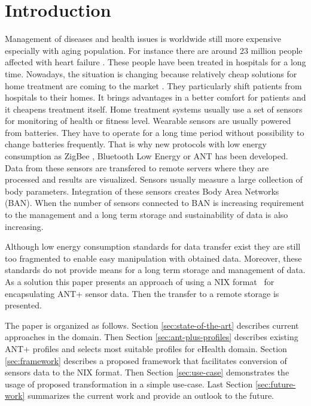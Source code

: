 \documentclass[conference]{IEEEtran}
\begin{document}
\section{Introduction}\label{sec:intro}
Management of diseases and health issues is worldwide still more expensive especially with aging population. For instance there are around 23 million people affected with heart failure \cite{bui2011epidemiology}. These people have been treated in hospitals for a long time. Nowadays, the situation is changing because relatively cheap solutions for home treatment are coming to the market \cite{4761985, 5333913}. They particularly shift patients from hospitals to their homes. It brings advantages in a better comfort for patients and it cheapens treatment itself. Home treatment systems usually use a set of sensors for monitoring of health or fitness level. Wearable sensors are usually powered from batteries. They have to operate for a long time period without possibility to change batteries frequently. That is why new protocols with low energy consumption as ZigBee \cite{Farahani:2008:ZWN:1457417}, Bluetooth Low Energy \cite{heydon2012bluetooth} or ANT \cite{zaloker2014ant} has been developed.  Data from these sensors are transfered to remote servers where they are processed and results are visualized. Sensors usually measure a large collection of body parameters. Integration of these sensors creates Body Area Networks (BAN). When the number of sensors connected to BAN is increasing requirement to the management and a long term storage and sustainability of data is also increasing.

Although low energy consumption standards for data transfer exist they are still too fragmented to enable easy manipulation with obtained data. Moreover, these standards do not provide means for a long term storage and management of data. As a solution this paper presents an approach of using a NIX format~\cite{Stoewer:2014} for encapsulating ANT+ sensor data. Then the transfer to a remote storage is presented. 

The paper is organized as follows. Section \ref{sec:state-of-the-art} describes current approaches in the domain. Then Section \ref{sec:ant-plus-profiles} describes existing ANT+ profiles and selects most suitable profiles for eHealth domain. Section \ref{sec:framework} describes a proposed framework that facilitates conversion of sensors data to the NIX format. Then Section \ref{sec:use-case} demonstrates the usage of proposed transformation in a simple use-case. Last Section \ref{sec:future-work} summarizes the current work and provide an outlook to the future.
\end{document}

